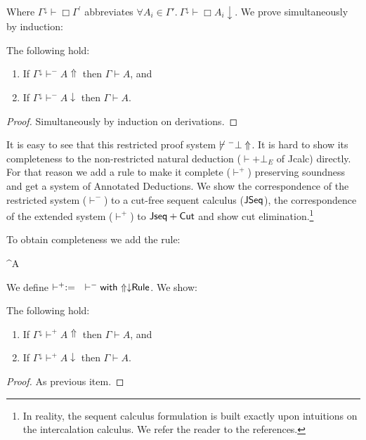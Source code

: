 					Where $\Gamma^\downarrow\vdash\Box \Gamma^{\prime}$ abbreviates $\forall A_i\in \Gamma'. \ \Gamma^{\downarrow}\vdash\Box A_i\downarrow$.
					We prove simultaneously by induction:
					\begin{theorem}
						The following hold:
						\begin{enumerate}
							\item If $\Gamma^\downarrow\vdash^{-} A\Uparrow$ then $\Gamma\vdash A$, and
							\item If $\Gamma^\downarrow\vdash^{-} A\downarrow $ then $\Gamma\vdash A$.
						\end{enumerate}
					\end{theorem}
					\begin{proof}
						Simultaneously by induction on derivations.
					\end{proof}
					It is easy to see that this restricted proof system $\centernot\vdash^{-} \bot\Uparrow$. It is hard to show its completeness to the non-restricted natural deduction ($\vdash + \bot_E$ of Jcalc) directly. For that reason we add a rule to make it complete ($\vdash^{+}$) preserving soundness and get a system of Annotated Deductions. We show the correspondence of the restricted system ($\vdash^{-}$) to a cut-free sequent calculus (${\sf JSeq}$), the correspondence of the extended system ($\vdash^{+}$) to ${\sf Jseq + Cut}$ and show cut elimination.\footnote{ In reality, the sequent calculus formulation is built exactly upon intuitions on the intercalation calculus. We refer the reader to the references.}
					
					To obtain completeness we add the rule:
					\begin{mathpar}
						 {\Gamma^\downarrow\vdash A\downarrow }
					\end{mathpar}
					We define $\vdash^{+} :=\   \ \ \vdash^{-} {\sf with} {\ \sf \Uparrow\downarrow}{\sf Rule}$.
					We show:
					\begin{theorem}
						The following hold:
						\begin{enumerate}
							\item If $\Gamma^\downarrow\vdash^{+} A\Uparrow$ then $\Gamma\vdash A$, and
							\item If $\Gamma^\downarrow\vdash^{+} A\downarrow $ then $\Gamma\vdash A$.
						\end{enumerate}
					\end{theorem}
					\begin{proof}
						As previous item.
					\end{proof}
					
